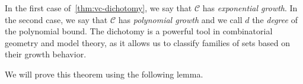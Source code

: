 \begin{remark}
    In the first case of~\ref{thm:vc-dichotomy}, we say that $\mathcal{C}$ has \emph{exponential growth}. In the second case, we say that $\mathcal{C}$ has \emph{polynomial growth} and we call $d$ the \emph{degree} of the polynomial bound. The dichotomy is a powerful tool in combinatorial geometry and model theory, as it allows us to classify families of sets based on their growth behavior.

    We will prove this theorem using the following lemma.
\end{remark}